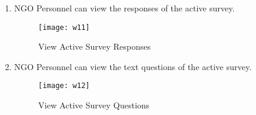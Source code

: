 \begin{enumerate}
\item NGO Personnel can view the responses of the active survey.
\begin{figure}[here]
\begin{center}   
\texttt{[image: w11]}
\caption{View Active Survey Responses}
\label{fig:w11}
\end{center}
\end{figure}


\item NGO Personnel can view the text questions of the active survey.
\begin{figure}[here]
\begin{center}   
\texttt{[image: w12]}
\caption{View Active Survey Questions}
\label{fig:w12}
\end{center}
\end{figure}
 
\end{enumerate}













